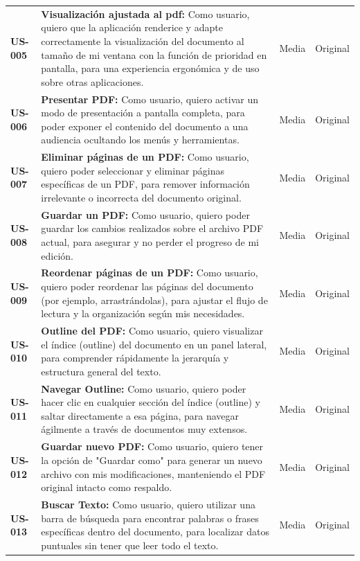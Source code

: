 \begin{longtable}{|l||p{7cm}|l|l|}
\textbf{US-005} & 
\textbf{Visualización ajustada al pdf:} Como usuario, quiero que la aplicación renderice y adapte correctamente la visualización del documento al tamaño de mi ventana con la función de prioridad en pantalla, para una experiencia ergonómica y de uso sobre otras aplicaciones. & Media & Original\\

\textbf{US-006} & 
\textbf{Presentar PDF:} Como usuario, quiero activar un modo de presentación a pantalla completa, para poder exponer el contenido del documento a una audiencia ocultando los menús y herramientas. & Media & Original\\

\textbf{US-007} & 
\textbf{Eliminar páginas de un PDF:} Como usuario, quiero poder seleccionar y eliminar páginas específicas de un PDF, para remover información irrelevante o incorrecta del documento original. & Media & Original\\

\textbf{US-008} & 
\textbf{Guardar un PDF:} Como usuario, quiero poder guardar los cambios realizados sobre el archivo PDF actual, para asegurar y no perder el progreso de mi edición. & Media & Original\\

\textbf{US-009} & 
\textbf{Reordenar páginas de un PDF:} Como usuario, quiero poder reordenar las páginas del documento (por ejemplo, arrastrándolas), para ajustar el flujo de lectura y la organización según mis necesidades. & Media & Original\\

\textbf{US-010} & 
\textbf{Outline del PDF:} Como usuario, quiero visualizar el índice (outline) del documento en un panel lateral, para comprender rápidamente la jerarquía y estructura general del texto. & Media & Original\\

\textbf{US-011} & 
\textbf{Navegar Outline:} Como usuario, quiero poder hacer clic en cualquier sección del índice (outline) y saltar directamente a esa página, para navegar ágilmente a través de documentos muy extensos. & Media & Original\\

\textbf{US-012} & 
\textbf{Guardar nuevo PDF:} Como usuario, quiero tener la opción de "Guardar como" para generar un nuevo archivo con mis modificaciones, manteniendo el PDF original intacto como respaldo. & Media & Original\\

\textbf{US-013} & 
\textbf{Buscar Texto:} Como usuario, quiero utilizar una barra de búsqueda para encontrar palabras o frases específicas dentro del documento, para localizar datos puntuales sin tener que leer todo el texto. & Media & Original\\


\end{longtable}
